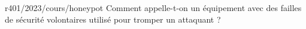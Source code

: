 \begin{question}{r401/2023/cours/honeypot}
  Comment appelle-t-on un équipement avec des failles de sécurité
  volontaires utilisé pour tromper un attaquant ?
  \begin{reponseshoriz}
  \end{reponseshoriz}
\end{question}
